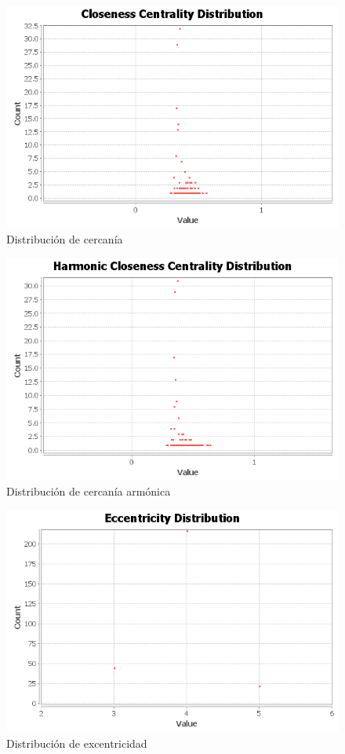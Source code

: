 \begin{figure}[H]
	\centering
	\includegraphics[width=12cm]{img/closeness-centrality-distribution}
	\caption{Distribución de cercanía}
	\label{fig:closeness-centrality-distribution}
\end{figure}

\begin{figure}[H]
	\centering
	\includegraphics[width=12cm]{img/harmonic-closeness-centrality-distribution}
	\caption{Distribución de cercanía armónica}
	\label{fig:harmonic-closeness-centrality-distribution}
\end{figure}

\begin{figure}[H]
	\centering
	\includegraphics[width=12cm]{img/eccentricity-distribution}
	\caption{Distribución de excentricidad}
	\label{fig:eccentricity-distribution}
\end{figure}

